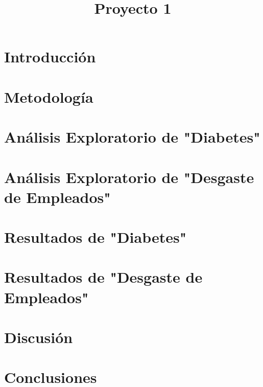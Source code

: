 \documentclass[conference]{IEEEtran}
\begin{document}
\title{Proyecto 1\\
}

\author{
\and
{}
}

\maketitle

\begin{abstract}

\end{abstract}

\begin{IEEEkeywords}

\end{IEEEkeywords}

\section{Introducción}

\section{Metodología}

\section{Análisis Exploratorio de "Diabetes"}

\section{Análisis Exploratorio de "Desgaste de Empleados"}

\section{Resultados de "Diabetes"}

\section{Resultados de "Desgaste de Empleados"}

\section{Discusión}

\section{Conclusiones}


\begin{thebibliography}{00}
\end{thebibliography}
\end{document}
